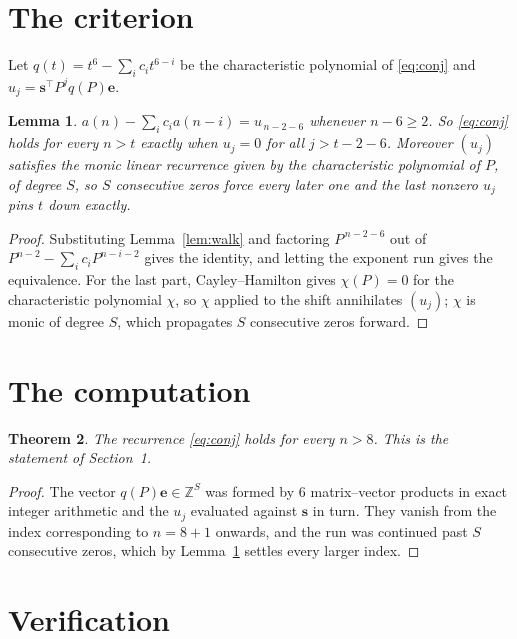 \documentclass[11pt,a4paper]{article}
\theoremstyle{plain}
\newtheorem{theorem}{Theorem}
\newtheorem{lemma}[theorem]{Lemma}
\theoremstyle{definition}
\begin{document}
\section{The criterion}

Let $q(t)=t^{6}-\sum_i c_i t^{6-i}$ be the characteristic polynomial of
\eqref{eq:conj} and $u_j=\mathbf{s}^{\!\top}P^{j}q(P)\mathbf{e}$.

\begin{lemma}\label{lem:crit}
$a(n)-\sum_i c_i a(n-i)=u_{\,n-2-6}$ whenever $n-6\ge2$. So \eqref{eq:conj}
holds for every $n>t$ exactly when $u_j=0$ for all $j>t-2-6$. Moreover $(u_j)$
satisfies the monic linear recurrence given by the characteristic polynomial of $P$, of
degree $S$, so $S$ consecutive zeros force every later one and the last nonzero $u_j$ pins
$t$ down exactly.
\end{lemma}

\begin{proof}
Substituting Lemma~\ref{lem:walk} and factoring $P^{\,n-2-6}$ out of
$P^{n-2}-\sum_i c_i P^{n-i-2}$ gives the identity, and letting the exponent run gives the
equivalence. For the last part, Cayley--Hamilton gives $\chi(P)=0$ for the characteristic
polynomial $\chi$, so $\chi$ applied to the shift annihilates $(u_j)$; $\chi$ is monic of
degree $S$, which propagates $S$ consecutive zeros forward.
\end{proof}

\section{The computation}

\begin{theorem}
The recurrence \eqref{eq:conj} holds for every $n>8$. This is the statement of
Section~1.
\end{theorem}

\begin{proof}
The vector $q(P)\mathbf{e}\in\mathbb{Z}^{S}$ was formed by $6$ matrix--vector
products in exact integer arithmetic and the $u_j$ evaluated against $\mathbf{s}$ in turn.
They vanish from the index corresponding to $n=8+1$ onwards, and the run was continued
past $S$ consecutive zeros, which by Lemma~\ref{lem:crit} settles every larger index.
\end{proof}

\section{Verification}
\end{document}
